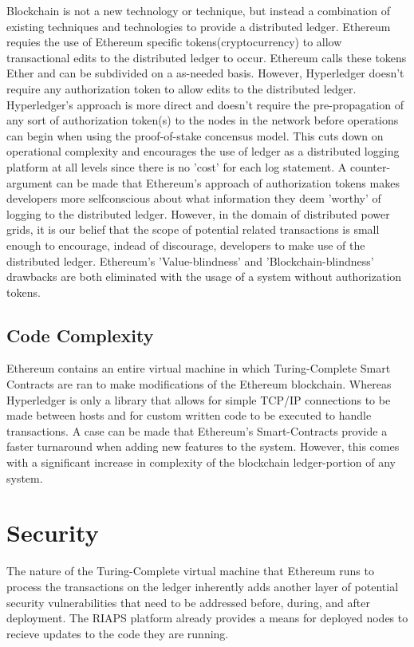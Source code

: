 \documentclass[a4paper,10pt]{article}
\begin{document}
Blockchain is not a new technology or technique, but instead a combination of existing techniques and technologies to provide a distributed ledger. Ethereum requies the use of Ethereum specific tokens(cryptocurrency) to allow transactional edits to the distributed ledger to occur. Ethereum calls these tokens Ether and can be subdivided on a as-needed basis. However, Hyperledger doesn't require any authorization token to allow edits to the distributed ledger. Hyperledger's approach is more direct and doesn't require the pre-propagation of any sort of authorization token(s) to the nodes in the network before operations can begin when using the proof-of-stake concensus model. This cuts down on operational complexity and encourages the use of ledger as a distributed logging platform at all levels since there is no 'cost' for each log statement. A counter-argument can be made that Ethereum's approach of authorization tokens makes developers more selfconscious about what information they deem 'worthy' of logging to the distributed ledger. However, in the domain of distributed power grids, it is our belief that the scope of potential related transactions is small enough to encourage, indead of discourage, developers to make use of the distributed ledger. Ethereum's 'Value-blindness' and 'Blockchain-blindness' drawbacks are both eliminated with the usage of a system without authorization tokens.  


\subsection{Code Complexity}

Ethereum contains an entire virtual machine in which Turing-Complete Smart Contracts are ran to make modifications of the Ethereum blockchain. Whereas Hyperledger is only a library that allows for simple TCP/IP connections to be made between hosts and for custom written code to be executed to handle transactions. A case can be made that Ethereum's Smart-Contracts provide a faster turnaround when adding new features to the system. However, this comes with a significant increase in complexity of the blockchain ledger-portion of any system.


\section{Security}

The nature of the Turing-Complete virtual machine that Ethereum runs to process the transactions on the ledger inherently adds another layer of potential security vulnerabilities that need to be addressed before, during, and after deployment. The RIAPS platform already provides a means for deployed nodes to recieve updates to the code they are running. 
\end{document}
